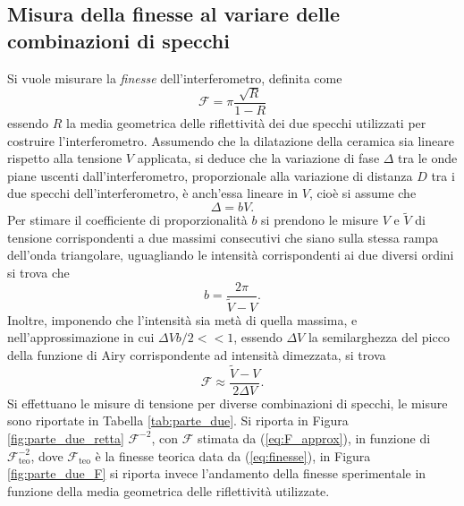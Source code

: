 \documentclass[10pt,oneside,a4paper]{article}
\newenvironment{Figure}
  {\par\medskip\noindent\minipage{\linewidth}}
  {\endminipage\par\medskip}
\begin{document}
\begin{multicols}{2}
\section{Misura della finesse al variare delle combinazioni di specchi}
Si vuole misurare la \emph{finesse} dell'interferometro, definita come 
\begin{equation}\label{eq:finesse}
	\mathcal{F} = \pi \frac{\sqrt{R} }{1-R}
\end{equation}
essendo $R$ la media geometrica delle riflettività dei due specchi utilizzati per costruire l'interferometro. Assumendo che la dilatazione della ceramica sia lineare rispetto alla tensione $V$ applicata, si deduce che la variazione di fase $\Delta$ tra le onde piane uscenti dall'interferometro, proporzionale alla variazione di distanza $D$ tra i due specchi dell'interferometro, è anch'essa lineare in $V$, cioè si assume che
\[
	\Delta = b V.
\]
Per stimare il coefficiente di proporzionalità $b$ si prendono le misure $V$ e $\tilde{V}$ di tensione corrispondenti a due massimi consecutivi che siano sulla stessa rampa dell'onda triangolare, uguagliando le intensità corrispondenti ai due diversi ordini si trova che
\begin{equation}\label{eq:b}
	b=\frac{2\pi}{\tilde{V}-V}.
\end{equation}
Inoltre, imponendo che l'intensità sia metà di quella massima, e nell'approssimazione in cui $\Delta V b/ 2<< 1$, essendo $\Delta V$ la semilarghezza del picco della funzione di Airy corrispondente ad intensità dimezzata, si trova
\begin{equation}\label{eq:F_approx}
	\mathcal{F} \approx \frac{\tilde{V} - V}{2 \Delta V}.
\end{equation}
Si effettuano le misure di tensione per diverse combinazioni di specchi, le misure sono riportate in Tabella \ref{tab:parte_due}. Si riporta in Figura \ref{fig:parte_due_retta} $\mathcal{F}^{-2}$, con $\mathcal{F}$ stimata da (\ref{eq:F_approx}), in funzione di $\mathcal{F}_\mathrm{teo}^{-2}$, dove $\mathcal{F}_\mathrm{teo}$ è la finesse teorica data da (\ref{eq:finesse}), in Figura \ref{fig:parte_due_F} si riporta invece l'andamento della finesse sperimentale in funzione della media geometrica delle riflettività utilizzate.
\begin{Figure}
	\begin{center}

\end{center}
\end{Figure}
\end{multicols}
\end{document}
